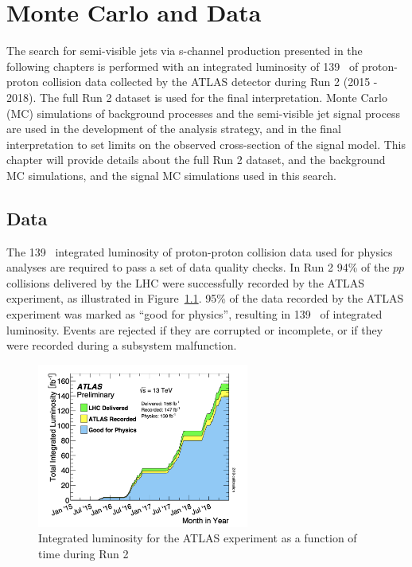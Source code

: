 \chapter{Monte Carlo and Data}
\label{ch:mc_data}

The search for semi-visible jets via s-channel production presented in the following chapters is performed with an integrated luminosity of 139 \fb~of proton-proton collision data collected by the ATLAS detector during Run 2 (2015 - 2018). The full Run 2 dataset is used for the final interpretation. Monte Carlo (MC) simulations of background processes and the semi-visible jet signal process are used in the development of the analysis strategy, and in the final interpretation to set limits on the observed cross-section of the signal model. This chapter will provide details about the full Run 2 dataset, and the background MC simulations, and the signal MC simulations used in this search. 

\section{Data}
The 139 \fb~integrated luminosity of proton-proton collision data used for physics analyses are required to pass a set of data quality checks. In Run 2 94\% of the $pp$ collisions delivered by the LHC were successfully recorded by the ATLAS experiment, as illustrated in Figure~\ref{fig:atlas_grl}. 95\% of the data recorded by the ATLAS experiment was marked as ``good for physics'', resulting in 139 \fb~of integrated luminosity. Events are rejected if they are corrupted or incomplete, or if they were recorded during a subsystem malfunction. 

\begin{figure}
        \centering
	\includegraphics[width=0.62\textwidth]{figures/ch6/atlas_grl}
	\caption{Integrated luminosity for the ATLAS experiment as a function of time during Run 2 \cite{atlas_grl}
	\label{fig:atlas_grl}}
\end{figure}

